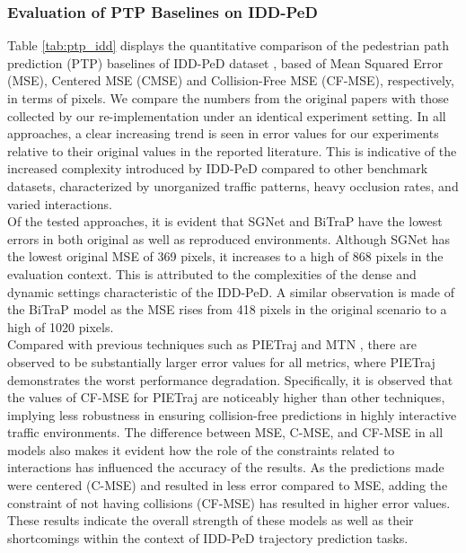 \documentclass[12pt, a4paper]{article}
\begin{document}
\subsubsection{Evaluation of PTP Baselines on IDD-PeD}
Table \ref{tab:ptp_idd} displays the quantitative comparison of the pedestrian path prediction (PTP) baselines of IDD-PeD dataset \cite{bokkasam2025pedestrian}, based of Mean Squared Error (MSE), Centered MSE (CMSE) and Collision-Free MSE (CF-MSE), respectively, in terms of pixels. We compare the numbers from the original papers with those collected by our re-implementation under an identical experiment setting. In all approaches, a clear increasing trend is seen in error values for our experiments relative to their original values in the reported literature. This is indicative of the increased complexity introduced by IDD-PeD compared to other benchmark datasets, characterized by unorganized traffic patterns, heavy occlusion rates, and varied interactions.\\

Of the tested approaches, it is evident that SGNet \cite{wang2022stepwise} and BiTraP \cite{yao2021bitrap} have the lowest errors in both original as well as reproduced environments. Although SGNet has the lowest original MSE of 369 pixels, it increases to a high of 868 pixels in the evaluation context. This is attributed to the complexities of the dense and dynamic settings characteristic of the IDD-PeD. A similar observation is made of the BiTraP model as the MSE rises from 418 pixels in the original scenario to a high of 1020 pixels.\\

Compared with previous techniques such as PIETraj \cite{rasouli2019pie} and MTN \cite{yin2021multimodal}, there are observed to be substantially larger error values for all metrics, where PIETraj demonstrates the worst performance degradation. Specifically, it is observed that the values of CF-MSE for PIETraj are noticeably higher than other techniques, implying less robustness in ensuring collision-free predictions in highly interactive traffic environments. The difference between MSE, C-MSE, and CF-MSE in all models also makes it evident how the role of the constraints related to interactions has influenced the accuracy of the results. As the predictions made were centered (C-MSE) and resulted in less error compared to MSE, adding the constraint of not having collisions (CF-MSE) has resulted in higher error values. These results indicate the overall strength of these models as well as their shortcomings within the context of IDD-PeD trajectory prediction tasks.\\
\end{document}
